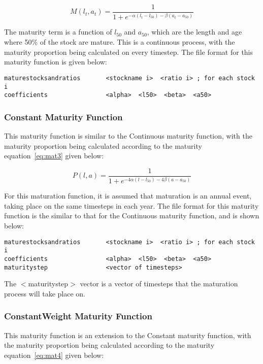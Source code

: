 \documentclass [a4paper, 10pt]{book}
\begin{document}
\begin{equation}\label{eq:mat1b}
M(l_{t},a_{t}) = \frac{1}{1 + e^{-\alpha(l_{t} - l_{50}) - \beta(a_{t} - a_{50})}}
\end{equation}

\bigskip
The maturity term is a function of $l_{50}$ and $a_{50}$, which are the length and age where 50\% of the stock are mature.  This is a continuous process, with the maturity proportion being calculated on every timestep.  The file format for this maturity function is given below:

{\small\begin{verbatim}
maturestocksandratios       <stockname i>  <ratio i> ; for each stock i
coefficients                <alpha>  <l50>  <beta>  <a50>
\end{verbatim}}

\subsubsection{Constant Maturity Function}
This maturity function is similar to the Continuous maturity function, with the maturity proportion being calculated according to the maturity equation~\ref{eq:mat3} given below:

\begin{equation}\label{eq:mat3}
P(l, a) = \frac{1}{ 1 + e^{-4\alpha(l - l_{50}) -4\beta(a - a_{50})}}
\end{equation}

For this maturation function, it is assumed that maturation is an annual event, taking place on the same timesteps in each year.  The file format for this maturity function is the similar to that for the Continuous maturity function, and is shown below:

{\small\begin{verbatim}
maturestocksandratios       <stockname i>  <ratio i> ; for each stock i
coefficients                <alpha>  <l50>  <beta>  <a50>
maturitystep                <vector of timesteps>
\end{verbatim}}

The $<$maturitystep$>$ vector is a vector of timesteps that the maturation process will take place on.

\subsubsection{ConstantWeight Maturity Function}
This maturity function is an extension to the Constant maturity function, with the maturity proportion being calculated according to the maturity equation~\ref{eq:mat4} given below:
\end{document}
